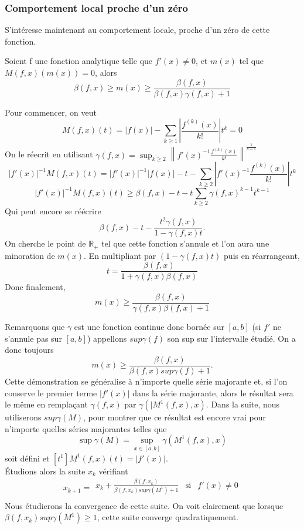 \documentclass[a4paper,10.5pt]{article}
\begin{document}
	\subsubsection{Comportement local proche d'un zéro}
	S'intéresse maintenant au comportement locale, proche d'un zéro de cette fonction.
	\begin{theorem}
		Soient f une fonction analytique telle que $f'(x)\neq 0$, et $m(x)$ tel que $M(f,x)(m(x))=0$, alors
		\[\beta(f,x) \geq m(x)\geq\frac{\beta(f,x)}{\beta(f,x)\gamma(f,x)+1}\]
	\end{theorem}
	\begin{demonstration}
	
	Pour commencer, on veut  
	\[M(f,x)(t)=|f(x)|-\sum_{k\geq1}|\frac{f^{(k)}(x)}{k!}|t^{k}=0\]
	On le réecrit en utilisant $\gamma(f,x)=\sup_{k \geq 2}\left\|f'(x)^{-1}\frac{f^{(k)}(x)}{k!}\right\|^{\frac{1}{k-1}}$
	\[|f'(x)|^{-1}M(f,x)(t)=|f'(x)|^{-1}|f(x)|-t-\sum_{k\geq2}|f'(x)^{-1}\frac{f^{(k)}(x)}{k!}|t^{k}\]
	\[|f'(x)|^{-1}M(f,x)(t)\geq \beta(f,x)-t-t\sum_{k\geq2}\gamma(f,x)^{k-1}t^{k-1}\]
	Qui peut encore se réécrire
	\[\beta(f,x)-t-\frac{t^2\gamma(f,x)}{1-\gamma(f,x) t}.\]
	On cherche le point de $\mathbb{R}_+$ tel que cette fonction s'annule et l'on aura une minoration de $m(x)$. En multipliant par $(1-\gamma(f,x) t)$ puis en réarrangeant,
	\[t=\frac{\beta(f,x)}{1+\gamma(f,x) \beta(f,x)}\]
	Donc finalement,
	\[m(x)\geq\frac{\beta(f,x)}{\gamma(f,x) \beta(f,x)+1} \]
	\end{demonstration}
	\vspace{7mm}
	Remarquons que $\gamma$ est une fonction continue donc bornée sur $[a,b]$ (si $f'$ ne s'annule pas sur $[a,b]$) appellons $sup\gamma(f)$ son sup sur l'intervalle étudié. On a donc toujours
	\[m(x)\geq\frac{\beta(f,x)}{\beta(f,x)sup\gamma(f)+1}.\]
    Cette démonstration se généralise à n'importe quelle série majorante et, si l'on conserve le premier terme $|f'(x)|$ dans la série majorante, alors le résultat sera le même en remplaçant $\gamma(f,x)$ par $\gamma(|M^1(f,x),x)$. Dans la suite, nous utiliserons $sup\gamma(M)$, pour montrer que ce résultat est encore vrai pour n'importe quelles séries majorantes telles que 
    \[\sup\gamma(M)=\sup_{x\in[a,b]}\gamma(M^1(f,x),x) \]
    soit défini et $[t^1]M^1(f,x)(t)=|f'(x)|$.
    \\
    Étudions alors la suite $x_k$ vérifiant 
    \begin{equation}
    x_{k+1}=
    \begin{array}{ccc}
    x_k+\frac{\beta(f,x_k)}{\beta(f,x_k)sup\gamma(M^1)+1} & \mbox{si} & f'(x)\neq 0\\
    \end{array}
    \end{equation}
    Nous étudierons la convergence de cette suite. On voit clairement que lorsque $\beta(f,x_k)sup\gamma(M^1) \geq 1$, cette suite converge quadratiquement.
	
\end{document}
